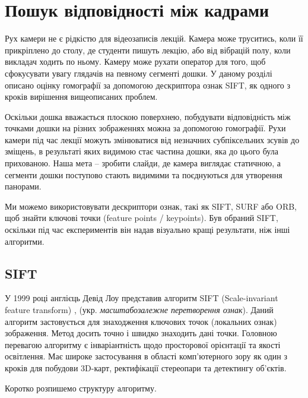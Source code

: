 \section{Пошук відповідності між кадрами}

Рух камери не є рідкістю для відеозаписів лекцій. Камера може труситись,
коли її прикріплено до столу, де студенти пишуть лекцію, або від
вібрацій полу, коли викладач ходить по ньому. Камеру може рухати
оператор для того, щоб сфокусувати увагу глядачів на певному сегменті
дошки. У даному розділі описано оцінку гомографії за допомогою
дескриптора ознак SIFT, як одного з кроків вирішення вищеописаних
проблем.

Оскільки дошка вважається плоскою поверхнею, побудувати відповідність
між точками дошки на різних зображеннях можна за допомогою гомографії.
Рухи камери під час лекції можуть змінюватися від незначних
субпіксельних зсувів до зміщень, в результаті яких видимою стає частина
дошки, яка до цього була прихованою. Наша мета -- зробити слайди, де
камера виглядає статичною, а сегменти дошки поступово стають видимими та
поєднуються для утворення панорами.

Ми можемо використовувати дескриптори ознак, такі як SIFT, SURF або ORB,
щоб знайти ключові точки (feature points / keypoints). Був обраний SIFT, оскільки під час
експериментів він надав візуально кращі результати, ніж інші алгоритми.


\subsection{SIFT}

У 1999 році англієць Девід Лоу представив алгоритм SIFT (Scale-invariant feature transform)
\cite{sift}, (укр. \textit{масштабозалежне перетворення ознак}). Даний алгоритм
застовується для знаходження ключових точок (локальних ознак) зображення. Метод досить точно
і швидко знаходить дані точки.
Головною перевагою алгоритму є інваріантність щодо просторової орієнтації та якості освітлення.
Має широке застосування в області комп'ютерного зору як один з кроків для побудови 3D-карт,
ректифікації стереопари та детектингу об'єктів.

Коротко розпишемо структуру алгоритму.

